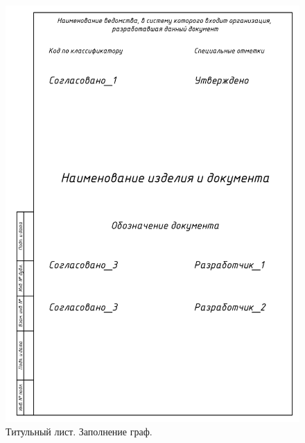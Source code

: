 \documentclass[14pt]{extreport}
\begin{document}
\begin{figure}[h]
	\centering
	\includegraphics[width=\textwidth]{ESKD_TIT_LIST_without_tagname}
    \caption{Титульный лист. Заполнение граф.\label{ESKD_TIT_LIST_without_tagname}}
\end{figure}
\end{document}
